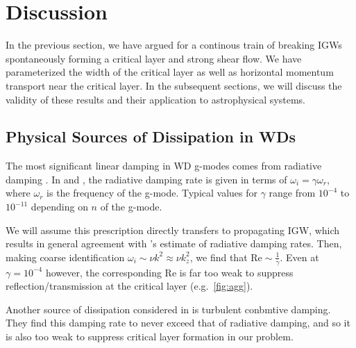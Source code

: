 \documentclass[
        fleqn,
        usenatbib,
    ]{mnras}
\begin{document}
\section{Discussion}\label{s:discussion}

In the previous section, we have argued for a continous train of breaking IGWs
spontaneously forming a critical layer and strong shear flow. We have
parameterized the width of the critical layer as well as horizontal momentum
transport near the critical layer. In the subsequent sections, we will discuss
the validity of these results and their application to astrophysical systems.

\subsection{Physical Sources of Dissipation in WDs}\label{ss:disp}

The most significant linear damping in WD g-modes comes from radiative damping
\citep{fullerI}. In \citep{wu} and \citep{fullerI}, the radiative damping rate
is given in terms of $\omega_i = \gamma \omega_r$, where $\omega_r$ is the
frequency of the g-mode. Typical values for $\gamma$ range from $10^{-4}$ to
$10^{-11}$ depending on $n$ of the g-mode.

We will assume this prescription directly transfers to propagating IGW, which
results in general agreement with \citep{bukart}'s estimate of radiative damping
rates. Then, making coarse identification $\omega_i \sim \nu k^2 \approx \nu
k_z^2$, we find that $\mathrm{Re} \sim \frac{1}{\gamma}$. Even at $\gamma =
10^{-4}$ however, the corresponding $\mathrm{Re}$ is far too weak to suppress
reflection/transmission at the critical layer (e.g.\ \autoref{fig:agg}).

Another source of dissipation considered in \citep{bukart} is turbulent
conbmtive damping. They find this damping rate to never exceed that of
radiative damping, and so it is also too weak to suppress critical layer
formation in our problem.
\end{document}
